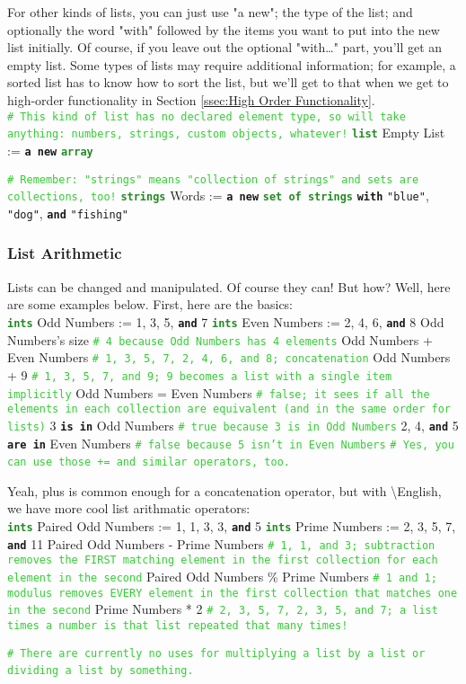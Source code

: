 \documentclass{article}
\newcommand{\name}{\textbackslash{}English}				%
\newcommand{\sssecl}[1]{\subsubsection{#1}\label{sssec:#1}}
\newcommand{\codecomment}[1]{\texttt{\textcolor{LimeGreen}{#1}}}
\newcommand{\commentline}[1]{\codecomment{\# #1}}
\newcommand{\type}[1]{\texttt{\textcolor{ForestGreen}{\textbf{#1}}}}
\newcommand{\common}[1]{\texttt{\textcolor{Mulberry}{\textbf{#1}}}}
\newcommand{\codestring}[1]{\texttt{\textcolor{NavyBlue}{"#1"}}}
\newenvironment{code}[0]
{\ttfamily{}				%
\setlength\parindent{0cm}	%
~\\}
{\setlength\parindent{1cm}
~\\}
\begin{document}
\indent For other kinds of lists, you can just use "a new"; the type of the list; and optionally the word "with" followed by the items you want to put into the new list initially. Of course, if you leave out the optional "with\ldots" part, you'll get an empty list. Some types of lists may require additional information; for example, a sorted list has to know how to sort the list, but we'll get to that when we get to high-order functionality in Section \ref{ssec:High Order Functionality}.
\begin{code}
\commentline{This kind of list has no declared element type, so will take anything: numbers, strings, custom objects, whatever!}
\type{list} Empty List := \common{a new} \type{array}

\commentline{Remember: "strings" means "collection of strings" and sets are collections, too!}
\type{strings} Words := \common{a new} \type{set of strings} \common{with} \codestring{blue}, \codestring{dog}, \common{and} \codestring{fishing}
\end{code}

\sssecl{List Arithmetic}
\indent Lists can be changed and manipulated. Of course they can! But how? Well, here are some examples below. First, here are the basics:
\begin{code}
\type{ints} Odd Numbers := 1, 3, 5, \common{and} 7
\type{ints} Even Numbers := 2, 4, 6, \common{and} 8
Odd Numbers's size \commentline{4 because Odd Numbers has 4 elements}
Odd Numbers + Even Numbers \commentline{1, 3, 5, 7, 2, 4, 6, and 8; concatenation}
Odd Numbers + 9 \commentline{1, 3, 5, 7, and 9; 9 becomes a list with a single item implicitly}
Odd Numbers = Even Numbers \commentline{false; it sees if all the elements in each collection are equivalent (and in the same order for lists)}
3 \common{is in} Odd Numbers \commentline{true because 3 is in Odd Numbers}
2, 4, \common{and} 5 \common{are in} Even Numbers \commentline{false because 5 isn't in Even Numbers}
\commentline{Yes, you can use those += and similar operators, too.}
\end{code}

\indent Yeah, plus is common enough for a concatenation operator, but with \name{}, we have more cool list arithmatic operators:
\begin{code}
\type{ints} Paired Odd Numbers := 1, 1, 3, 3, \common{and} 5
\type{ints} Prime Numbers := 2, 3, 5, 7, \common{and} 11
Paired Odd Numbers - Prime Numbers \commentline{1, 1, and 3; subtraction removes the FIRST matching element in the first collection for each element in the second}
Paired Odd Numbers \% Prime Numbers \commentline{1 and 1; modulus removes EVERY element in the first collection that matches one in the second}
Prime Numbers * 2 \commentline{2, 3, 5, 7, 2, 3, 5, and 7; a list times a number is that list repeated that many times!}

\commentline{There are currently no uses for multiplying a list by a list or dividing a list by something.}
\end{code}
\end{document}
